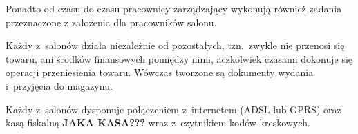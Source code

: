 Ponadto od czasu do czasu pracownicy zarządzający wykonują również zadania przeznaczone z założenia dla pracowników salonu.

Każdy z~salonów działa niezależnie od pozostałych, tzn.\ zwykle nie przenosi się towaru, ani środków finansowych pomiędzy nimi, aczkolwiek czasami dokonuje się operacji przeniesienia towaru. Wówczas tworzone są dokumenty wydania i~przyjęcia do magazynu.

Każdy z~salonów dysponuje połączeniem z~internetem (ADSL lub GPRS) oraz kasą fiskalną \textbf{JAKA KASA???} wraz z~czytnikiem kodów kreskowych.

